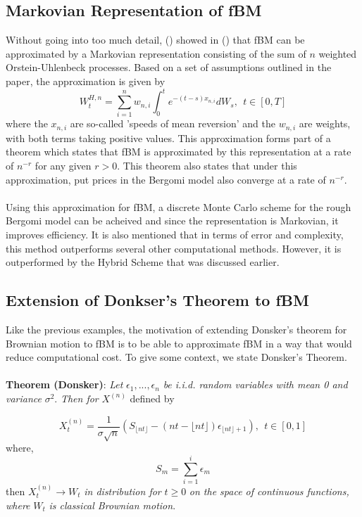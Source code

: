 \documentclass[12pt,oneside]{article}
\begin{document}
\subsection{Markovian Representation of fBM}
\label{subsec:markovian_rep_fBm}
Without going into too much detail, (\cite{HARMS}) showed in (\cite{PAPER}) that fBM can be approximated by a Markovian representation consisting of the sum of $n$ weighted Orstein-Uhlenbeck processes.  Based on a set of assumptions outlined in the paper, the approximation is given by 
$$W_t^{H,n} = \sum_{i=1}^n w_{n,i} \int_0^t e^{-(t-s)x_{n,i}}dW_s, \ \ t \in [0,T]$$ 
where the $x_{n,i}$ are so-called 'speeds of mean reversion' and the $w_{n,i}$ are weights, with both terms taking positive values. This approximation forms part of a theorem which states that fBM is approximated by this representation at a rate of $n^{-r}$ for any given $r>0$.  This theorem also states that under this approximation, put prices in the Bergomi model also converge at a rate of $n^{-r}$. 
\\
\\
Using this approximation for fBM, a discrete Monte Carlo scheme for the rough Bergomi model can be acheived and since the representation is Markovian, it improves efficiency. It is also mentioned that in terms of error and complexity,  this method outperforms several other computational methods. However, it is outperformed by the Hybrid Scheme that was discussed earlier. 

\subsection{Extension of Donkser's Theorem to fBM}
Like the previous examples, the motivation of extending Donsker's theorem for Brownian motion to fBM is to be able to approximate fBM in a way that would reduce computational cost. To give some context,  we state Donsker's Theorem.
\\
\\
 \textbf{Theorem (Donsker)}: \textit{Let} $\epsilon_1,...,\epsilon_n$ \textit{be i.i.d. random variables with mean 0 and variance} $\sigma^2$. \textit{Then for} $X^{(n)}$ defined by
 
 \begin{equation}
 \label{eq:donkser_thm}
 X_t^{(n)} = \frac{1}{\sigma \sqrt{n}} (S_{\lfloor nt \rfloor} - (nt - \lfloor nt \rfloor) \epsilon_{\lfloor nt \rfloor + 1}), \ \ t\in[0,1]
 \end{equation}
 where,
\begin{equation}
S_m = \sum_{i=1}^i \epsilon_m
\end{equation}
then $X_t^{(n)} \rightarrow W_t$ \textit{in distribution for} $t\ge0$ \textit{on the space of continuous functions, where} $W_t$ \textit{is classical Brownian motion}.
\\
\end{document}
